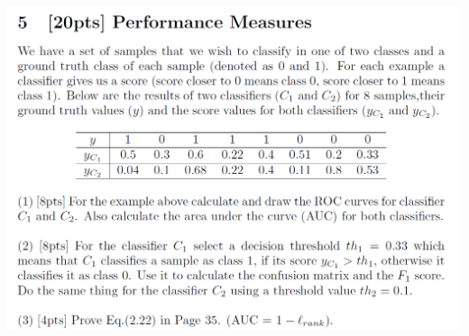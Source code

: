 \documentclass[11pt, a4paper, UTF8]{ctexart}
\begin{document}
\begin{problem}[ML problem 5]

	\includegraphics[scale=0.3]{5-p.png}

\end{problem}
\newpage
\end{document}
